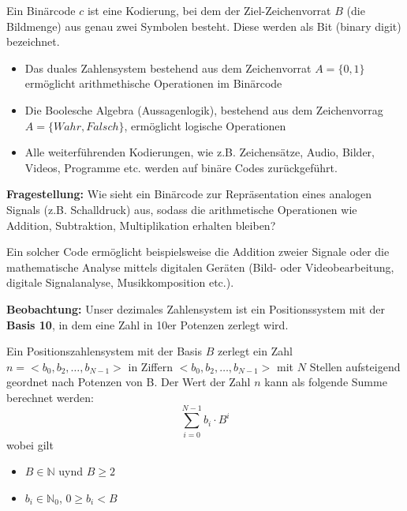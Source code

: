 \begin{bsslide}[\textbufferB]
  \begin{definition}
    Ein Bin\"arcode $c$ ist eine Kodierung, bei dem der
    Ziel-Zeichenvorrat $B$ (die Bildmenge) aus genau zwei Symbolen besteht. Diese werden als Bit (binary digit) bezeichnet.
  \end{definition}
  \begin{itemize}
  \item Das duales Zahlensystem bestehend aus dem Zeichenvorrat $A=\{0,1\}$ erm\"oglicht arithmethische Operationen im Bin\"arcode
  \item Die Boolesche Algebra (Aussagenlogik), bestehend aus dem Zeichenvorrag $A=\{Wahr,Falsch\}$,  erm\"oglicht logische Operationen 
  \item Alle weiterf\"uhrenden Kodierungen, wie z.B. Zeichens\"atze,
    Audio, Bilder, Videos, Programme etc. werden auf bin\"are Codes zur\"uckgef\"uhrt.
  \end{itemize}
\end{bsslide}

\begin{bsslide}[\textbufferB]
  \textbf{Fragestellung:} Wie sieht ein Bin\"arcode zur Repr\"asentation eines analogen Signals (z.B. Schalldruck) aus, sodass die arithmetische Operationen wie Addition, Subtraktion, Multiplikation erhalten bleiben?

  Ein solcher Code erm\"oglicht beispielsweise die Addition zweier Signale oder die mathematische Analyse mittels digitalen Ger\"aten (Bild- oder Videobearbeitung, digitale Signalanalyse, Musikkomposition etc.).
\end{bsslide}
\begin{bsslide}[\textbufferB]
  \textbf{Beobachtung:} Unser dezimales Zahlensystem ist ein Positionssystem mit der \textbf{Basis 10}, in dem eine Zahl in 10er Potenzen zerlegt wird.
  \begin{definition}[Positionszahlensystem]
    Ein Positionszahlensystem mit der Basis $B$ zerlegt ein Zahl $n=<b_0,b_2,\ldots,b_{N-1}>$ in Ziffern $<b_0,b_2,\ldots,b_{N-1}>$ mit $N$ Stellen aufsteigend geordnet nach Potenzen von B. Der Wert der Zahl $n$ kann als folgende Summe berechnet werden:
    \[
    \sum_{i=0}^{N-1}b_i\cdot B ^i
    \]
    wobei gilt
    \begin{itemize}
    \item $B\in \mathbb{N}$ uynd $B\geq 2$ 
    \item $b_i \in \mathbb{N}_0$, $0\geq b_i< B$
    \end{itemize}
  \end{definition}

\end{bsslide}

